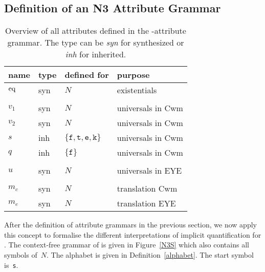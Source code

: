 \subsection{Definition of an N3 Attribute Grammar}
\begin{table}\centering
\begin{tabular}{llll}
\hline
name \hspace*{0.1\textwidth}& type \hspace*{0.1\textwidth}
& defined for \hspace*{0.1\textwidth} &purpose \\
 \hline
 $\text{eq}$ & syn  & $ N$& existentials\\
 \\
 $v_1$ & syn &$ N$& universals in Cwm \\
 $v_2$ & syn &$ N$ & universals in Cwm\\
 $s$ & inh &$\{\texttt{f}, \texttt{t},\texttt{e}, \texttt{k}\}$& universals in Cwm \\
  $q$ & inh &$\{\texttt{f}\}$& universals in Cwm \\
  \\
  $u$ & syn &$ N$& universals in EYE \\
  \\
  $m_c$ & syn  &$ N$& translation Cwm\\
  $m_e$ &syn &$ N$& translation EYE \\
  \hline
\end{tabular}
\caption{Overview of all attributes defined in the \nthree-attribute grammar. The type can be \emph{syn} for synthesized or \emph{inh} for inherited. \label{attributes}}
\end{table}

After the definition of attribute grammars in the previous section, 
we now apply this concept to 
formalise the different interpretations of implicit quantification for \nthreelogic. 
The context-free grammar of \nthree is given in Figure~\ref{N3S} which also contains all symbols of~$N$. The alphabet is given in Definition~\ref{alphabet}. 
The start symbol is~\texttt{s}.

